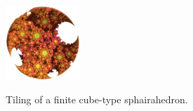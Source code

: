 \documentclass[dvipdfmx]{interact}
\theoremstyle{plain}%
\theoremstyle{definition}
\theoremstyle{remark}
\theoremstyle{problemstyle}
\begin{document}
\begin{figure}[H]
\begin{minipage}[t]{0.19\textwidth}
  \label{fig:sphaira-step10}
 \end{minipage}
 \hspace*{\fill}
 \begin{minipage}[t]{0.19\textwidth}
  \centering
  \includegraphics[width=1.1in, height=1.1in, keepaspectratio]{./img/constructFractal/finiteProcess/final.png}
  \label{fig:sphaira-final}
 \end{minipage}
 \hspace*{\fill}
 \caption{Tiling of a finite cube-type sphairahedron.}
 \label{fig:sphairahedronTile}
\end{figure}
\end{document}
